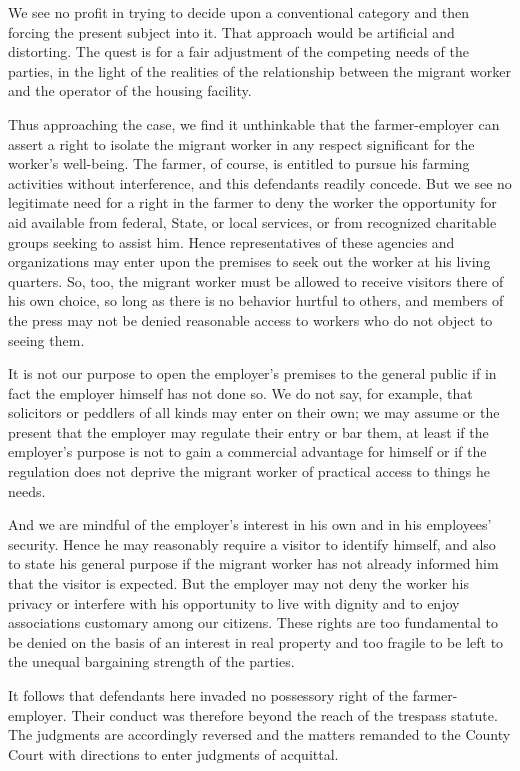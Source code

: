 We see no profit in trying to decide upon a conventional category and then
forcing the present subject into it. That approach would be artificial and
distorting. The quest is for a fair adjustment of the competing needs of the
parties, in the light of the realities of the relationship between the migrant
worker and the operator of the housing facility.

Thus approaching the case, we find it unthinkable that the farmer-employer can
assert a right to isolate the migrant worker in any respect significant for the
worker's well-being. The farmer, of course, is entitled to pursue his farming
activities without interference, and this defendants readily concede. But we
see no legitimate need for a right in the farmer to deny the worker the
opportunity for aid available from federal, State, or local services, or from
recognized charitable groups seeking to assist him. Hence representatives of
these agencies and organizations may enter upon the premises to seek out the
worker at his living quarters. So, too, the migrant worker must be allowed to
receive visitors there of his own choice, so long as there is no behavior
hurtful to others, and members of the press may not be denied reasonable access
to workers who do not object to seeing them.

It is not our purpose to open the employer's premises to the general public if
in fact the employer himself has not done so. We do not say, for example, that
solicitors or peddlers of all kinds may enter on their own; we may assume or
the present that the employer may regulate their entry or bar them, at least if
the employer's purpose is not to gain a commercial advantage for himself or if
the regulation does not deprive the migrant worker of practical access to
things he needs.

And we are mindful of the employer's interest in his own and in his employees'
security. Hence he may reasonably require a visitor to identify himself, and
also to state his general purpose if the migrant worker has not already
informed him that the visitor is expected. But the employer may not deny the
worker his privacy or interfere with his opportunity to live with dignity and
to enjoy associations customary among our citizens. These rights are too
fundamental to be denied on the basis of an interest in real property and too
fragile to be left to the unequal bargaining strength of the parties.

It follows that defendants here invaded no possessory right of the
farmer-employer. Their conduct was therefore beyond the reach of the trespass
statute. The judgments are accordingly reversed and the matters remanded to the
County Court with directions to enter judgments of acquittal.

